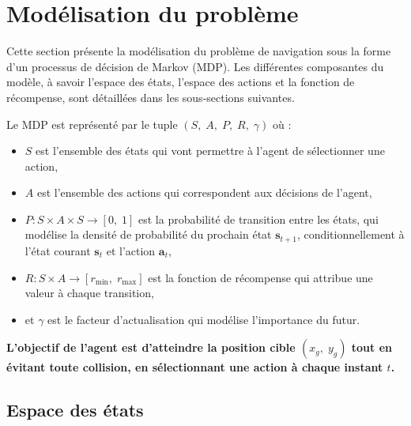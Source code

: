 \section{Modélisation du problème}

\begin{tcolorbox}[colback=black!5,colframe=black,title=]
    Cette section présente la modélisation du problème de navigation sous la forme d'un processus de décision de Markov (MDP). Les différentes composantes du modèle, à savoir l'espace des états, l'espace des actions et la fonction de récompense, sont détaillées dans les sous-sections suivantes.
\end{tcolorbox}

\noindent Le MDP est représenté par le tuple $(S, \; A, \; P, \; R, \; \gamma)$ où :

\vspace{10pt}

\begin{itemize}
    \item $S$ est l’ensemble des états qui vont permettre à l'agent de sélectionner une action,
    \item $A$ est l’ensemble des actions qui correspondent aux décisions de l'agent,
    \item $P : S \times A \times S \rightarrow [0, \; 1]$ est la probabilité de transition entre les états, qui modélise la densité de probabilité du prochain état $\mathbf{s}_{t+1}$, conditionnellement à l'état courant $\mathbf{s}_t$ et l'action $\mathbf{a}_t$,
    \item $R : S \times A \rightarrow [r_\text{min}, \; r_\text{max}]$ est la fonction de récompense qui attribue une valeur à chaque transition,
    \item et $\gamma$ est le facteur d'actualisation qui modélise l'importance du futur.
\end{itemize}

\vspace{10pt}

\noindent \textbf{L'objectif de l'agent est d'atteindre la position cible $(x_g, \; y_g)$ tout en évitant toute collision, en sélectionnant une action à chaque instant $t$.}




\subsection{Espace des états}

